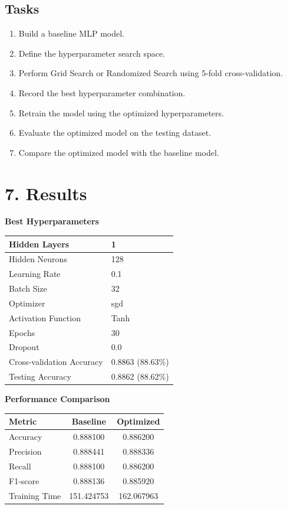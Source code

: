 \documentclass[11pt]{article}
\begin{document}
\subsection*{Tasks}

\begin{enumerate}
\item Build a baseline MLP model.
\item Define the hyperparameter search space.
\item Perform Grid Search or Randomized Search using 5-fold cross-validation.
\item Record the best hyperparameter combination.
\item Retrain the model using the optimized hyperparameters.
\item Evaluate the optimized model on the testing dataset.
\item Compare the optimized model with the baseline model.
\end{enumerate}

\section*{7. Results}

\textbf{Best Hyperparameters}

\begin{tabular}{|p{6cm}|p{6cm}|}
\hline
Hidden Layers & 1 \\
\hline
Hidden Neurons & 128 \\
\hline
Learning Rate & 0.1 \\
\hline
Batch Size & 32 \\
\hline
Optimizer & sgd \\
\hline
Activation Function & Tanh \\
\hline
Epochs & 30 \\
\hline
Dropout & 0.0 \\
\hline
Cross-validation Accuracy & 0.8863 (88.63\%)\\
\hline
Testing Accuracy & 0.8862 (88.62\%)\\
\hline
\end{tabular}

\vspace{3mm}

\textbf{Performance Comparison}

\begin{tabular}{|p{4cm}|c|c|}
\hline
Metric & Baseline & Optimized\\
\hline
Accuracy& 0.888100 & 0.886200 \\
Precision& 0.888441 & 0.888336 \\
Recall& 0.888100 & 0.886200 \\
F1-score& 0.888136 & 0.885920 \\
Training Time& 151.424753 & 162.067963 \\
\hline
\end{tabular}
\end{document}
